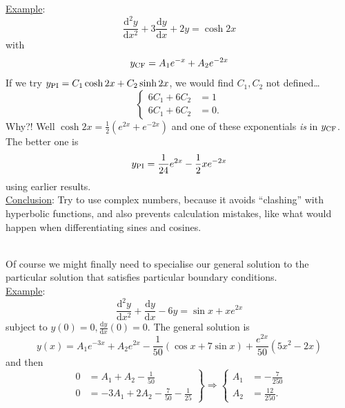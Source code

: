 \documentclass[12pt]{report}
\theoremstyle{definition}
\begin{document}
\begin{enumerate}[label = (\alph*)]
                \underline{Example}:\[
                    \frac{\mathrm{d}^{2}y}{\mathrm{d}x^{2}} + 3\frac{\mathrm{d}y}{\mathrm{d}x} + 2y = \cosh{2x}
                \]
                with\[
                    y_{\textnormal{CF}} = A_1 e^{-x} + A_2 e^{-2x}
                \]
                If we try $y_{\textnormal{PI}} = C_1 \cosh{2x} + C_2 \sinh{2x}$,
                we would find $C_1, C_2$ not defined\ldots\[
                    \left\{
                        \begin{align*}
                            6C_1 + 6C_2 & = 1 \\
                            6C_1 + 6C_2 & = 0.
                        \end{align*}
                        \right.
                \]
                Why?! Well $\cosh{2x} = \frac{1}{2}(e^{2x} + e^{-2x})$ and
                one of these exponentials \emph{is} in $y_{\textnormal{CF}}$.
                The better one is \[
                    y_{\textnormal{PI}} = \frac{1}{24} e^{2x} - \frac{1}{2} x e^{-2x}
                \]using earlier results.
                \smallskip
                \\\underline{Conclusion}: Try to use complex numbers, because it avoids ``clashing'' with
                hyperbolic functions, and also prevents calculation mistakes, like what would happen when
                differentiating sines and cosines.
\end{enumerate}
\\Of course we might finally need to specialise our general solution to the particular solution
that satisfies particular boundary conditions.
\\\underline{Example}:\[
    \frac{\mathrm{d}^{2}y}{\mathrm{d}x^{2}} + \frac{\mathrm{d}y}{\mathrm{d}x} - 6y = \sin{x} + xe^{2x}
\]subject to $y(0) = 0, \frac{\mathrm{d}y}{\mathrm{d}x} (0) = 0$.
The general solution is\[
    y(x) = A_1e^{-3x} + A_2e^{2x} - \frac{1}{50}(\cos{x} + 7\sin{x}) + \frac{e^{2x}}{50} (5x^{2} - 2x)%
\]and then\[
    \left.\begin{align*}
            0 & = A_1 + A_2 - \frac{1}{50} \\
            0 & = -3A_1 + 2A_2 - \frac{7}{50} - \frac{1}{25}
    \end{align*}
\right\} \Rightarrow{} \left\{
\begin{align*}
    A_1 & = -\frac{7}{250} \\
    A_2 & = \frac{12}{250}.
\end{align*}
\right.
\]
\end{document}
